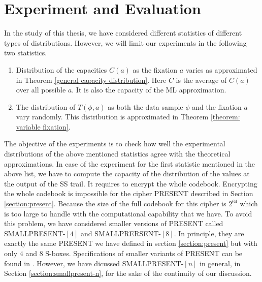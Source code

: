 \chapter{Experiment and Evaluation}
\label{chapter:experiment}
In the study of this thesis, we have considered different statistics of different types of distributions. However, we will limit our experiments in the following two statistics.
\begin{enumerate}
\item Distribution of the capacities $C(a)$ as the fixation $a$ varies as approximated in Theorem \ref{general capacity distribution}. Here $C$ is the average of $C\left(a\right)$ over all possible $a$. It is also the capacity of the ML approximation.
\item The distribution of $T(\phi,a)$ as both the data sample $\phi$ and the fixation $a$ vary randomly. This distribution is approximated in Theorem \ref{theorem: variable fixation}.
\end{enumerate} The objective of the experiments is to check how well the experimental distributions of the above mentioned statistics agree with the theoretical approximations. In case of the experiment for the first statistic mentioned in the above list, we have to compute the capacity of the distribution of the values at the output of the SS trail. It requires to encrypt the whole codebook. Encrypting the whole codebook is impossible for the cipher PRESENT described in Section \ref{section:present}. Because the size of the full codebook for this cipher is $2^{64}$ which is too large to handle with the computational capability that we have. To avoid this problem, we have considered smaller versions of PRESENT called SMALLPRESENT-$[4]$ and SMALLPRERSENT-$[8]$. In principle, they are exactly the same PRESENT we have defined in section \ref{section:present} but with only $4$ and $8$ S-boxes. Specifications of smaller variants of PRESENT can be found in \citep{smalpresent}. However, we have dicussed SMALLPRESENT-$[n]$ in general, in Section \ref{section:smallpresent-n}, for the sake of the continuity of our discussion.

